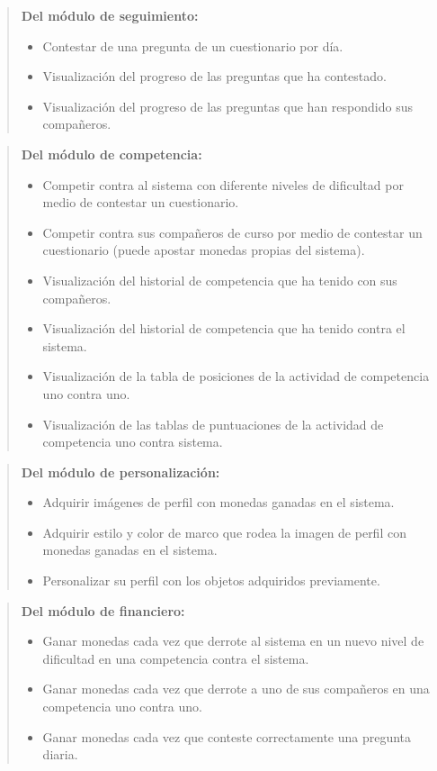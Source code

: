    \begin{quote}
    {\bf Del módulo de seguimiento:}
        \begin{itemize}
        \item Contestar de una pregunta de un cuestionario por día.
        \item Visualización del progreso de las preguntas que ha contestado.
        \item Visualización del progreso de las preguntas que han respondido sus compañeros.
        \end{itemize}
    \end{quote}

    \begin{quote}
    {\bf Del módulo de competencia:}
        \begin{itemize}
        \item Competir contra al sistema con diferente niveles de dificultad por medio de contestar un cuestionario.
        \item Competir contra sus compañeros de curso por medio de contestar un cuestionario (puede apostar monedas propias del sistema).
        \item Visualización del historial de competencia que ha tenido con sus compañeros.
        \item Visualización del historial de competencia que ha tenido contra el sistema.
        \item Visualización de la tabla de posiciones de la actividad de competencia uno contra uno.
        \item Visualización de las tablas de puntuaciones de la actividad de competencia uno contra sistema.
        \end{itemize}
    \end{quote}

    \begin{quote}
    {\bf Del módulo de personalización:}
        \begin{itemize}
        \item Adquirir imágenes de perfil con monedas ganadas en el sistema.
        \item Adquirir estilo y color de marco que rodea la imagen de perfil con monedas ganadas en el sistema.
        \item Personalizar su perfil con los objetos adquiridos previamente.
        \end{itemize}
    \end{quote}

    \begin{quote}
    {\bf Del módulo de financiero:}
        \begin{itemize}
        \item Ganar monedas cada vez que derrote al sistema en un nuevo nivel de dificultad en una competencia contra el sistema.
        \item Ganar monedas cada vez que derrote a uno de sus compañeros en una competencia uno contra uno.
        \item Ganar monedas cada vez que conteste correctamente una pregunta diaria.
        \end{itemize}
    \end{quote}

